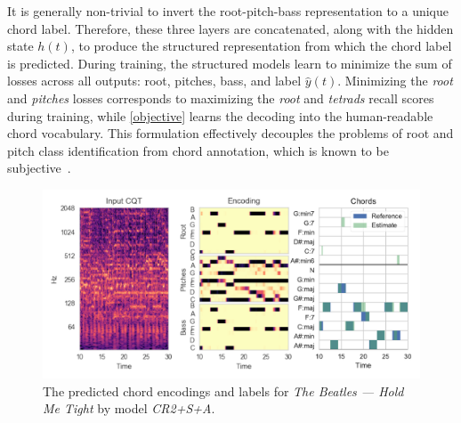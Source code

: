 \documentclass{article}
\begin{document}
It is generally non-trivial to invert the root-pitch-bass representation to a unique chord label.
Therefore, these three layers are concatenated, along with the hidden state $h(t)$, to produce the structured representation from which the chord label is predicted.
During training, the structured models learn to minimize the sum of losses across all outputs: root, pitches, bass, and label $\hat{y}(t)$.
Minimizing the \emph{root} and \emph{pitches} losses corresponds to maximizing the \emph{root} and \emph{tetrads} recall scores during training, while \cref{objective} learns the decoding into the human-readable chord vocabulary.
This formulation effectively decouples the problems of root and pitch class identification from chord annotation, which is known to be subjective~\cite{humphrey2015four}.
\begin{figure}[t]
    \centering
    \includegraphics[width=\columnwidth]{encviz}
    \caption{The predicted chord encodings and labels for \emph{The Beatles --- Hold Me Tight} by model \emph{CR2+S+A}.\label{fig:encviz}}
\end{figure}

\end{document}
